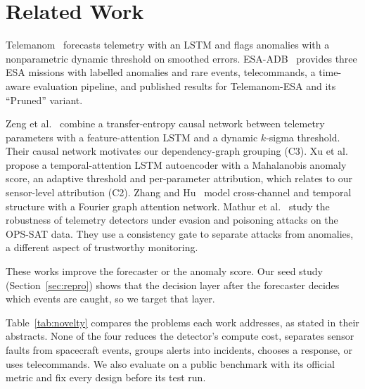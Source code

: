 \documentclass[conference]{IEEEtran}
\begin{document}
\section{Related Work}
Telemanom~\cite{hundman2018telemanom} forecasts telemetry with an LSTM and flags anomalies with a nonparametric dynamic threshold on smoothed errors. ESA-ADB~\cite{kotowski2024esaadb} provides three ESA missions with labelled anomalies and rare events, telecommands, a time-aware evaluation pipeline, and published results for Telemanom-ESA and its ``Pruned'' variant.

Zeng et al.~\cite{zeng2022causal} combine a transfer-entropy causal network between telemetry parameters with a feature-attention LSTM and a dynamic $k$-sigma threshold. Their causal network motivates our dependency-graph grouping (C3). Xu et al.~\cite{xu2023taae} propose a temporal-attention LSTM autoencoder with a Mahalanobis anomaly score, an adaptive threshold and per-parameter attribution, which relates to our sensor-level attribution (C2). Zhang and Hu~\cite{zhang2025fouriergat} model cross-channel and temporal structure with a Fourier graph attention network. Mathur et al.~\cite{mathur2026adeptrs} study the robustness of telemetry detectors under evasion and poisoning attacks on the OPS-SAT data. They use a consistency gate to separate attacks from anomalies, a different aspect of trustworthy monitoring.

These works improve the forecaster or the anomaly score. Our seed study (Section~\ref{sec:repro}) shows that the decision layer after the forecaster decides which events are caught, so we target that layer.

Table~\ref{tab:novelty} compares the problems each work addresses, as stated in their abstracts. None of the four reduces the detector's compute cost, separates sensor faults from spacecraft events, groups alerts into incidents, chooses a response, or uses telecommands. We also evaluate on a public benchmark with its official metric and fix every design before its test run.
\end{document}
